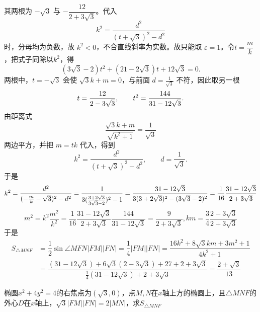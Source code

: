 \begin{solution}
\[    \]
    其两根为 $-\sqrt3$ 与 $-\dfrac{12}{2+3\sqrt3}$。代入
    \[
    k^2=\frac{d^2}{(t+\sqrt3)^2-d^2}
    \]
    时，分母均为负数，故 $k^2<0$，不合直线斜率为实数。故只能取 $\varepsilon=1$。令$t=\dfrac{m}{k}$，把式子同除以$k^2$，得
    \[(3\sqrt3-2)t^2+(21-2\sqrt3)t+12\sqrt3=0.\]
    两根中，$t=-\sqrt3$ 会使 $\sqrt3k+m=0$，与前面 $d=\frac1{\sqrt3}$ 不符，因此取另一根
    \[t=\dfrac{12}{2-3\sqrt3},\qquad t^2=\dfrac{144}{31-12\sqrt3}.\vspace{-5pt}\]
    由距离式
    \[
    \frac{\sqrt3k+m}{\sqrt{k^2+1}}=\frac1{\sqrt3}
    \]
    两边平方，并把 $m=tk$ 代入，得到
    \[
    k^2=\frac{d^2}{(t+\sqrt3)^2-d^2},\qquad d=\frac1{\sqrt3}.
    \]
    于是
    \[k^2=\dfrac{d^2}{(-\frac{m}{k}-\sqrt3)^2-d^2}=\dfrac{1}{3(\frac{3+2\sqrt3}{3\sqrt3-2})^2-1}=\dfrac{31-12\sqrt3}{3(3+2\sqrt3)^2-(3\sqrt3-2)^2}=\dfrac{1}{16}\dfrac{31-12\sqrt3}{2+3\sqrt3}\vspace{-5pt}\]
    \[m^2=k^2\dfrac{m^2}{k^2}=\dfrac{1}{16}\dfrac{31-12\sqrt3}{2+3\sqrt3}\dfrac{144}{31-12\sqrt3}=\dfrac{9}{2+3\sqrt3},km=\dfrac34\dfrac{2-3\sqrt3}{2+3\sqrt3}\]\vspace{-10pt}
    于是
    \begin{align*}
        S_{\triangle{MNF}}&=\dfrac12\sin\angle{MFN}|FM||FN|=\dfrac{1}{4}|FM||FN|=\dfrac{16k^2+8\sqrt{3}km+3m^2+1}{4k^2+1}\\
        &=\dfrac{(31-12\sqrt3)+6\sqrt{3}(2-3\sqrt3)+27+2+3\sqrt3}{\frac14(31-12\sqrt3)+2+3\sqrt3}=\dfrac{2+\sqrt3}{13}
    \end{align*}
\end{solution}
\newpage
\begin{example}
    椭圆$x^2+4y^2=4$的右焦点为$(\sqrt3,0)$，点$M,N$在$x$轴上方的椭圆上，且$\triangle{MNF}$的外心$D$在$x$轴上，$\sqrt{3}|FM||FN|=2|MN|$，求$S_{\triangle{MNF}}$
\end{example}
